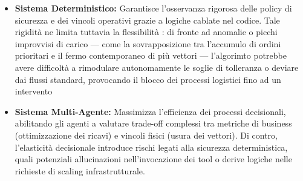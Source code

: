 \begin{itemize}
    \item \textbf{Sistema Deterministico:} Garantisce l'osservanza rigorosa delle policy di sicurezza e dei vincoli operativi grazie a logiche cablate nel codice. Tale rigidità ne limita tuttavia la flessibilità : di fronte ad anomalie o picchi improvvisi di carico — come la sovrapposizione tra l'accumulo di ordini prioritari e il fermo contemporaneo di più vettori — l'algorimto potrebbe avere difficoltà a rimodulare autonomamente le soglie di tolleranza o deviare dai flussi standard, provocando il blocco dei processi logistici fino ad un intervento
    \item \textbf{Sistema Multi-Agente:} Massimizza l'efficienza dei processi decisionali, abilitando gli agenti a valutare trade-off complessi tra metriche di business (ottimizzazione dei ricavi) e vincoli fisici (usura dei vettori). Di contro, l'elasticità decisionale introduce rischi legati alla sicurezza deterministica, quali potenziali allucinazioni nell'invocazione dei tool o derive logiche nelle richieste di scaling infrastrutturale.
\end{itemize}

